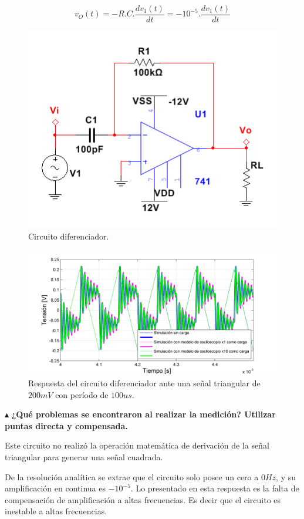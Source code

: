 \begin{equation}
v_O(t) = -R.C.\frac{dv_1(t)}{dt} = - 10^{-5}.\frac{dv_1(t)}{dt}
\end{equation}


\begin{figure}[H]
  \centering
\includegraphics[width=.5\textwidth]{gfx/DIFF}
  \caption{Circuito diferenciador.}
  \label{circ:diff}
\end{figure}

\begin{figure}[H]
  \centering
\includegraphics[width=1.1\textwidth]{gfx_22/DIFF_T}
  \caption{Respuesta del circuito diferenciador ante una señal triangular de $200mV$ con período de $100us$.}
  \label{t:diff}
\end{figure}


\noindent$\blacktriangle$\textbf{ ¿Qué problemas se encontraron al realizar la medición? Utilizar puntas directa y compensada.}

Este circuito no realizó la operación matemática de derivación de la señal triangular para generar una señal cuadrada.

De la resolución analítica se extrae que el circuito solo posee un cero a $0Hz$, y su amplificación en continua es $-10^{-5}$. Lo presentado en esta respuesta es la falta de compensación de amplificación a altas frecuencias. Es decir que el circuito es inestable a altas frecuencias.

